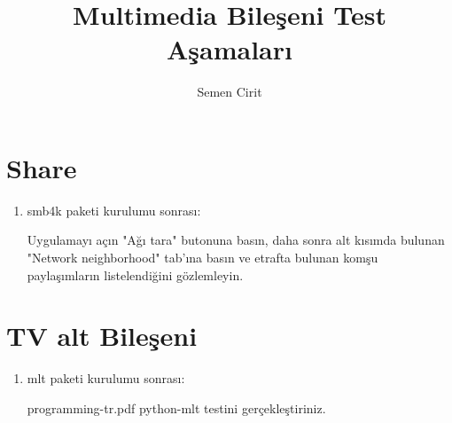 \documentclass[a4paper,10pt]{article}
\title{Multimedia Bileşeni Test Aşamaları}
\author{Semen Cirit}
\begin{document}
\maketitle

\section{Share}
\begin{enumerate}
 \item smb4k paketi kurulumu sonrası:

Uygulamayı açın "Ağı tara" butonuna basın, daha sonra alt kısımda bulunan "Network neighborhood" tab'ına basın ve etrafta bulunan komşu paylaşımların listelendiğini gözlemleyin.

\end{enumerate}

\section{TV alt Bileşeni}
\begin{enumerate}
 \item mlt paketi kurulumu sonrası:

programming-tr.pdf python-mlt testini gerçekleştiriniz.
\end{enumerate}
\end{document}
